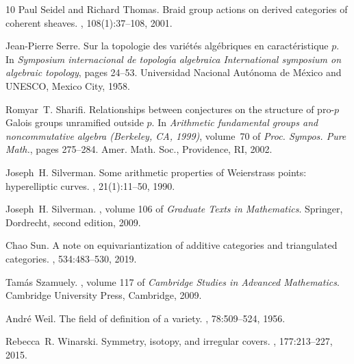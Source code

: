 \documentclass[10pt]{amsart}
\theoremstyle{definition}
\begin{document}
\begin{thebibliography}{10}
Paul Seidel and Richard Thomas.
\newblock Braid group actions on derived categories of coherent sheaves.
, 108(1):37--108, 2001.

Jean-Pierre Serre.
\newblock Sur la topologie des vari\'et\'es alg\'ebriques en caract\'eristique
  {$p$}.
\newblock In {\em Symposium internacional de topolog\'\i a algebraica
  International symposium on algebraic topology}, pages 24--53. Universidad
  Nacional Aut\'onoma de M\'exico and UNESCO, Mexico City, 1958.

Romyar~T. Sharifi.
\newblock Relationships between conjectures on the structure of pro-{$p$}
  {G}alois groups unramified outside {$p$}.
\newblock In {\em Arithmetic fundamental groups and noncommutative algebra
  ({B}erkeley, {CA}, 1999)}, volume~70 of {\em Proc. Sympos. Pure Math.}, pages
  275--284. Amer. Math. Soc., Providence, RI, 2002.

Joseph~H. Silverman.
\newblock Some arithmetic properties of {W}eierstrass points: hyperelliptic
  curves.
, 21(1):11--50, 1990.

Joseph~H. Silverman.
, volume 106 of {\em Graduate
  Texts in Mathematics}.
\newblock Springer, Dordrecht, second edition, 2009.

Chao Sun.
\newblock A note on equivariantization of additive categories and triangulated
  categories.
, 534:483--530, 2019.

Tam\'{a}s Szamuely.
, volume 117 of {\em
  Cambridge Studies in Advanced Mathematics}.
\newblock Cambridge University Press, Cambridge, 2009.

Andr{\'e} Weil.
\newblock The field of definition of a variety.
, 78:509--524, 1956.

Rebecca~R. Winarski.
\newblock Symmetry, isotopy, and irregular covers.
, 177:213--227, 2015.

\end{thebibliography}
\end{document}
